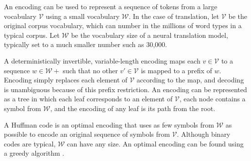 An encoding can be used to represent a sequence of tokens from a large
vocabulary $\mathcal{V}$ using a small vocabulary $\mathcal{W}$.  In the case
of translation, let $\mathcal{V}$ be the original corpus vocabulary, which can
number in the millions of word types in a typical corpus. Let $\mathcal{W}$ be
the vocabulary size of a neural translation model, typically
set to a much smaller number such as 30,000.

A deterministically invertible, variable-length encoding maps each
$v\in\mathcal{V}$ to a sequence $w \in \mathcal{W}+$ such that no other
$v'\in\mathcal{V}$ is mapped to a prefix of $w$. Encoding simply replaces each
element of $\mathcal{V}$ according to the map, and decoding is unambiguous because of this
prefix restriction. An encoding can be represented as a tree in which each leaf
corresponds to an element of $\mathcal{V}$, each node contains a symbol from
$\mathcal{W}$, and the encoding of any leaf is its path from the root.

A Huffman code is an optimal encoding that uses as few symbols from
$\mathcal{W}$ as possible to encode an original sequence of symbols from
$\mathcal{V}$. Although binary codes are typical, $\mathcal{W}$ can have any
size. An optimal encoding can be found using a greedy algorithm
\cite{huffman}.
